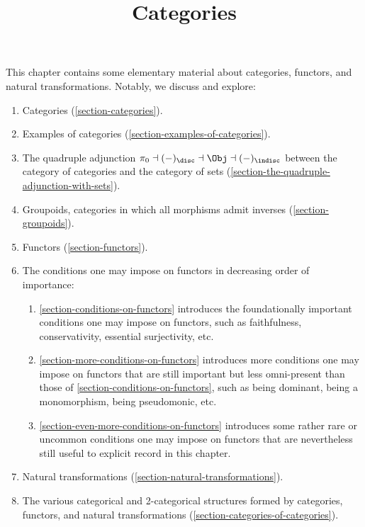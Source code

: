 

%



\title{Categories}

\maketitle

\label{section-phantom}

This chapter contains some elementary material about categories, functors, and natural transformations. Notably, we discuss and explore:
\begin{enumerate}
    \item\label{categories-introduction-item-1}Categories (\cref{section-categories}).
    \item\label{categories-introduction-item-2}Examples of categories (\cref{section-examples-of-categories}).
    \item\label{categories-introduction-item-3}The quadruple adjunction $\pi_{0}\dashv{(-)_{\disc}}\dashv\Obj\dashv{(-)_{\indisc}}$ between the category of categories and the category of sets (\cref{section-the-quadruple-adjunction-with-sets}).
    \item\label{categories-introduction-item-4}Groupoids, categories in which all morphisms admit inverses (\cref{section-groupoids}).
    \item\label{categories-introduction-item-5}Functors (\cref{section-functors}).
    \item\label{categories-introduction-item-6}The conditions one may impose on functors in decreasing order of importance:
        \begin{enumerate}
            \item\label{categories-introduction-item-6-a}\cref{section-conditions-on-functors} introduces the foundationally important conditions one may impose on functors, such as faithfulness, conservativity, essential surjectivity, etc.
            \item\label{categories-introduction-item-6-b}\cref{section-more-conditions-on-functors} introduces more conditions one may impose on functors that are still important but less omni-present than those of \cref{section-conditions-on-functors}, such as being dominant, being a monomorphism, being pseudomonic, etc.
            \item\label{categories-introduction-item-6-c}\cref{section-even-more-conditions-on-functors} introduces some rather rare or uncommon conditions one may impose on functors that are nevertheless still useful to explicit record in this chapter.
        \end{enumerate}
    \item\label{categories-introduction-item-7}Natural transformations (\cref{section-natural-transformations}).
    \item\label{categories-introduction-item-8}The various categorical and 2-categorical structures formed by categories, functors, and natural transformations (\cref{section-categories-of-categories}).
\end{enumerate}

